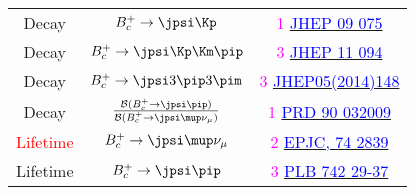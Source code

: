 {\begin{table}
\begin{center}
\begin{tabular}{c|c|c}
       Decay & $B_c^+ \to \jpsi \Kp$ & \textcolor{magenta}{\scriptsize 1} \href{http://arxiv.org/abs/1306.6723}{\textcolor{blue}{\tiny JHEP 09 075}} \\
       Decay & $B_c^+ \to \jpsi \Kp \Km \pip$ & \textcolor{magenta}{\scriptsize 3} \href{http://arxiv.org/abs/1309.0587}{\textcolor{blue}{\tiny JHEP 11 094}} \\
       Decay & $B_c^+ \to \jpsi 3\pip 3\pim$  & \textcolor{magenta}{\scriptsize 3} \href{https://arxiv.org/abs/1404.0287}{\textcolor{blue}{\tiny JHEP05(2014)148}} \\
       Decay & $\frac{\mathcal{B}(B^+_c\to \jpsi\pip) }{ \mathcal{B}(B^+_c\to \jpsi\mup \nu_\mu)} $ & \textcolor{magenta}{1} \href{http://journals.aps.org/prd/abstract/10.1103/PhysRevD.90.032009}{\textcolor{blue}{\tiny PRD 90 032009}} \\
       \textcolor{red}{Lifetime} & \textcolor{red}{$B_c^+ \to \jpsi \mup \nu_\mu$} & \textcolor{magenta}{2} \href{http://dx.doi.org/10.1140/epjc/s10052-014-2839-x}{\textcolor{blue}{\tiny EPJC, 74  2839}} \\ 
       Lifetime & $B_c^+ \to \jpsi \pip$ & \textcolor{magenta}{3} \href{http://arxiv.org/abs/1411.6899}{\textcolor{blue}{\tiny PLB 742 29-37}} 
      \end{tabular}
   \end{center}
   \end{table}
}


